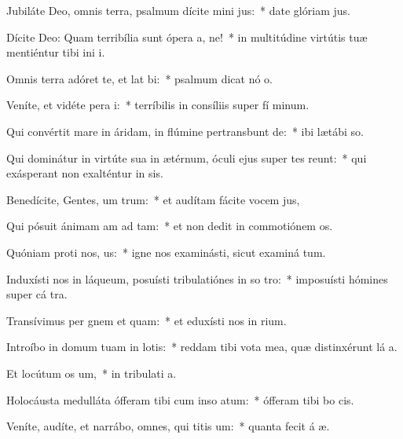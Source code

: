 \item Jubiláte Deo, omnis terra, psalmum dícite mini jus:~* date glóriam  jus.
\item Dícite Deo: Quam terribília sunt ópera a, ne!~* in multitúdine virtútis tuæ mentiéntur tibi ini i.
\item Omnis terra adóret te, et lat bi:~* psalmum dicat nó o.
\item Veníte, et vidéte pera i:~* terríbilis in consíliis super fí minum.
\item Qui convértit mare in áridam, in flúmine pertransbunt de:~* ibi lætábi  so.
\item Qui dominátur in virtúte sua in ætérnum, óculi ejus super tes reunt:~* qui exásperant non exalténtur in sis.
\item Benedícite, Gentes, um trum:~* et audítam fácite vocem  jus,
\item Qui pósuit ánimam am ad tam:~* et non dedit in commotiónem  os.
\item Quóniam proti nos, us:~* igne nos examinásti, sicut examiná tum.
\item Induxísti nos in láqueum, posuísti tribulatiónes in so tro:~* imposuísti hómines super cá tra.
\item Transívimus per gnem et quam:~* et eduxísti nos in rium.
\item Introíbo in domum tuam in lotis:~* reddam tibi vota mea, quæ distinxérunt lá a.
\item Et locútum  os um,~* in tribulati a.
\item Holocáusta medulláta ófferam tibi cum inso atum:~* ófferam tibi bo  cis.
\item Veníte, audíte, et narrábo, omnes, qui titis um:~* quanta fecit á æ.
